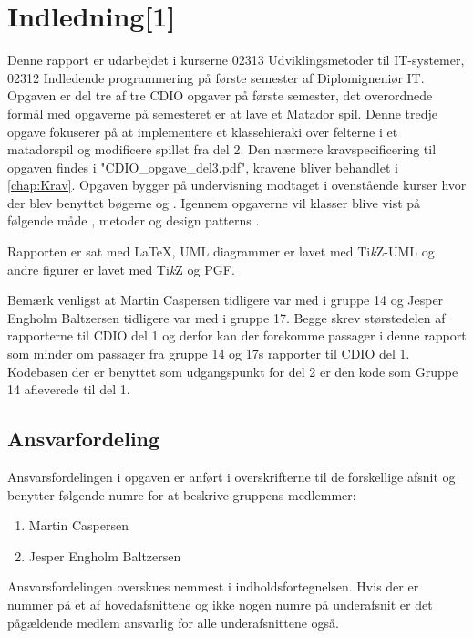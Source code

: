 \chapter{Indledning[1]}\label{chap:indledning}
Denne rapport er udarbejdet i kurserne 02313 Udviklingsmetoder til IT-systemer, 02312 Indledende programmering på første semester af Diplomigneniør IT. Opgaven er del tre af tre CDIO opgaver på første semester, det overordnede formål med opgaverne på semesteret er at lave et Matador spil. Denne tredje opgave fokuserer på at implementere et klassehieraki over felterne i et matadorspil og modificere spillet fra del 2. Den nærmere kravspecificering til opgaven findes i "CDIO\_opgave\_del3.pdf"\cite{CDIOdel3}, kravene bliver behandlet i \vref{chap:Krav}. Opgaven bygger på undervisning modtaget i ovenstående kurser hvor der blev benyttet bøgerne \cite{umlbook} og \cite{javabook}. Igennem opgaverne vil klasser blive vist på følgende måde , metoder  og design patterns .

Rapporten er sat med \LaTeX, UML diagrammer er lavet med Ti\emph{k}Z-UML og andre figurer er lavet med Ti\emph{k}Z og \textsc{PGF}.

Bemærk venligst at Martin Caspersen tidligere var med i gruppe 14 og Jesper Engholm Baltzersen tidligere var med i gruppe 17. Begge skrev størstedelen af rapporterne til CDIO del 1 og derfor kan der forekomme passager i denne rapport som minder om passager fra gruppe 14 og 17s rapporter til CDIO del 1. Kodebasen der er benyttet som udgangspunkt for del 2 er den kode som Gruppe 14 afleverede til del 1.

\section{Ansvarfordeling}\label{sec:indledning:ansvarsfordeling}

Ansvarsfordelingen i opgaven er anført i overskrifterne til de forskellige afsnit og benytter følgende numre for at beskrive gruppens medlemmer:
\begin{enumerate}
\item Martin Caspersen
\item Jesper Engholm Baltzersen
\end{enumerate}
Ansvarsfordelingen overskues nemmest i indholdsfortegnelsen. Hvis der er nummer på et af hovedafsnittene og ikke nogen numre på underafsnit er det pågældende medlem ansvarlig for alle underafsnittene også.

